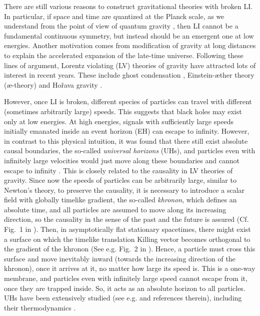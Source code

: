 \documentclass[aps,preprintnumbers,twocolumn,showpacs]{revtex4-1}
\begin{document}
There are still various reasons to construct gravitational theories with broken LI. In particular, if space and time are quantized at the Planck scale, as we understand from the point of view of quantum gravity \cite{Kiefer12},  then LI cannot be a fundamental continuous  symmetry, but instead  should be an emergent one at low energies. Another motivation comes from modification of gravity at long distances to explain the accelerated expansion of the late-time universe. Following these lines of argument, Lorentz violating (LV) theories of gravity have attracted lots of interest in recent years. These include  ghost condensation \cite{ArkaniHamed:2003uy}, Einstein-$\mbox{\ae}$ther theory ($\mbox{\ae}$-theory) \cite{Jacobson} and   Ho\v{r}ava   gravity \cite{Horava}.

However, once LI is broken, different species of particles can travel with different (sometimes arbitrarily large) speeds. This suggests that black holes may exist only at low energies.  At high energies, signals with sufficiently large speeds initially emanated inside an event horizon (EH) can escape to infinity. However, in contrast to this physical  intuition,  it was found that there still exist absolute causal boundaries, the so-called {\em universal horizons} (UHs), and particles even with infinitely large velocities would just move along these boundaries and cannot escape to infinity    \cite{BS11,BJS11,BBM12}. This is closely related to the causality in LV theories of gravity. Since now the speeds of particles can be arbitrarily large, similar to Newton's theory, to preserve the causality, it is necessary to introduce a scalar field with globally timelike gradient, the so-called {\em khronon}, which  defines an absolute time, and all particles are assumed to move along its increasing direction, so the causality in the sense of the past and the future is assured (Cf. Fig.~1 in  \cite{GLLSW}).  Then, in  asymptotically flat  stationary spacetimes, there might exist a surface on which the timelike translation Killing vector  becomes orthogonal to the gradient of the khronon  (See e.g. Fig.~2 in  \cite{LSW16}). Hence, a particle must cross this surface and move inevitably  inward (towards the increasing direction of the  khronon), once it arrives at it, no matter how large its speed is. This is a one-way membrane, and particles even with infinitely large speed cannot escape from it, once they are trapped inside. So, it acts as an absolute horizon to all particles. UHs have been extensively studied  {  (see e.g. \cite{Wang17} and references therein),} including their thermodynamics \cite{BBM13,CLMV,DWWZ}. 
 
\end{document}
